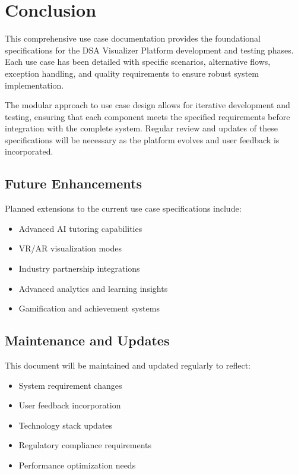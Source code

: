 \documentclass[12pt,a4paper]{article}
\begin{document}
\section{Conclusion}

This comprehensive use case documentation provides the foundational specifications for the DSA Visualizer Platform development and testing phases. Each use case has been detailed with specific scenarios, alternative flows, exception handling, and quality requirements to ensure robust system implementation.

The modular approach to use case design allows for iterative development and testing, ensuring that each component meets the specified requirements before integration with the complete system. Regular review and updates of these specifications will be necessary as the platform evolves and user feedback is incorporated.

\subsection{Future Enhancements}

Planned extensions to the current use case specifications include:
\begin{itemize}
    \item Advanced AI tutoring capabilities
    \item VR/AR visualization modes
    \item Industry partnership integrations
    \item Advanced analytics and learning insights
    \item Gamification and achievement systems
\end{itemize}

\subsection{Maintenance and Updates}

This document will be maintained and updated regularly to reflect:
\begin{itemize}
    \item System requirement changes
    \item User feedback incorporation
    \item Technology stack updates
    \item Regulatory compliance requirements
    \item Performance optimization needs
\end{itemize}
\end{document}
